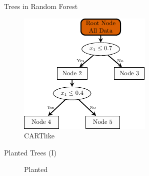 \documentclass[aspectratio=169,12pt]{beamer}
\begin{document}
\begin{frame}{Trees in Random Forest}
\label{trees-in-random-forest}
\begin{figure}[H]

{\centering \includegraphics[width=\linewidth,height=0.75\textheight,keepaspectratio]{tree-cart.pdf}

}

\caption{CARTlike}

\end{figure}%
\end{frame}

\begin{frame}{Planted Trees (I)}
\label{planted-trees-i}
\begin{figure}


\caption{\label{fig-planted}Planted}

\end{figure}%
\end{frame}
\end{document}
